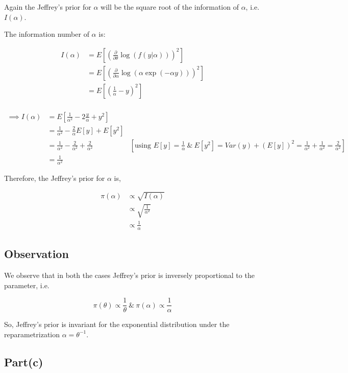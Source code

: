 \documentclass[a4paper]{article}
\begin{document}
Again the Jeffrey's prior for \(\alpha\) will be the square root of the information of \(\alpha\), i.e. \(I(\alpha)\).

The information number of \(\alpha\) is:

\begin{align*}
    I(\alpha) &= E \left[\left(\frac{\partial}{\partial \theta } \log(f(y|\alpha))\right)^2\right]\\
    &= E \left[\left(\frac{\partial}{\partial \alpha } \log\left(\alpha\exp\left(-\alpha y\right)\right)\right)^2\right]\\
    &= E \left[\left(\frac{1}{\alpha} -y \right)^2\right]\\
\end{align*}

\begin{align*}
    \implies I(\alpha) &= E \left[\frac{1}{\alpha^2} -2 \frac{y}{\alpha} + y^2\right]\\
    &= \frac{1}{\alpha^2} - \frac{2}{\alpha} E[y] + E[y^2]\\
    &= \frac{1}{\alpha^2} - \frac{2}{\alpha^2} + \frac{2}{\alpha^2} & \left[\text{using } E[y]=\frac{1}{\alpha} \ \&\ E[y^2] = Var(y) + (E[y])^2 =\frac{1}{\alpha^2} + \frac{1}{\alpha^2} = \frac{2}{\alpha^2}\right]\\
    &= \frac{1}{\alpha^2}
\end{align*}

Therefore, the Jeffrey's prior for \(\alpha\) is,

\begin{align*}
    \pi(\alpha) &\propto \sqrt{I(\alpha)}\\
    &\propto \sqrt{\frac{1}{\alpha^2}}\\
    &\propto \frac{1}{\alpha}
\end{align*}

\subsection*{Observation}
We observe that in both the cases Jeffrey's prior is inversely proportional to the parameter, i.e.

$$\pi(\theta)\propto \frac{1}{\theta} \ \&\ \pi(\alpha)\propto \frac{1}{\alpha}$$

\noindent So, Jeffrey's prior is invariant for the exponential distribution under the reparametrization \(\alpha = \theta^{-1}\).

\subsection*{Part(c)}
\end{document}
